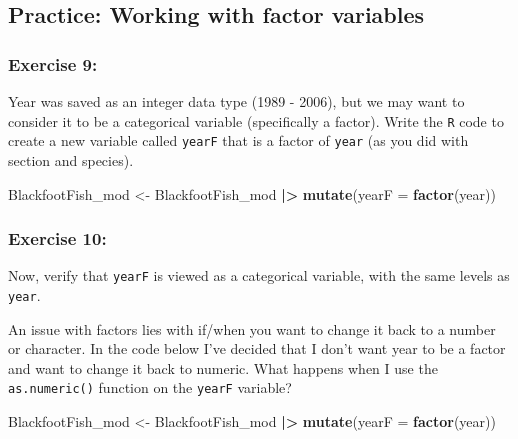 \documentclass[
  10pt,
  letterpaper,
  twoside,
  openright]{book}
\newenvironment{Shaded}{\begin{snugshade}}{\end{snugshade}}
\newcommand{\AttributeTok}[1]{\textcolor[rgb]{0.13,0.29,0.53}{#1}}
\newcommand{\FunctionTok}[1]{\textcolor[rgb]{0.13,0.29,0.53}{\textbf{#1}}}
\newcommand{\NormalTok}[1]{#1}
\newcommand{\OtherTok}[1]{\textcolor[rgb]{0.56,0.35,0.01}{#1}}
\newcommand{\SpecialCharTok}[1]{\textcolor[rgb]{0.81,0.36,0.00}{\textbf{#1}}}
\begin{document}
\hypertarget{practice-working-with-factor-variables}{%
\subsection{Practice: Working with factor
variables}\label{practice-working-with-factor-variables}}

\hypertarget{exercise-9}{%
\subsubsection{Exercise 9:}\label{exercise-9}}

Year was saved as an integer data type (1989 - 2006), but we may want to
consider it to be a categorical variable (specifically a factor). Write
the \texttt{R} code to create a new variable called \texttt{yearF} that
is a factor of \texttt{year} (as you did with section and species).

\begin{Shaded}
\begin{Highlighting}[]
\NormalTok{BlackfootFish\_mod }\OtherTok{\textless{}{-}}\NormalTok{ BlackfootFish\_mod }\SpecialCharTok{|\textgreater{}}
  \FunctionTok{mutate}\NormalTok{(}\AttributeTok{yearF =} \FunctionTok{factor}\NormalTok{(year))}
\end{Highlighting}
\end{Shaded}

\hypertarget{exercise-10}{%
\subsubsection{Exercise 10:}\label{exercise-10}}

Now, verify that \texttt{yearF} is viewed as a categorical variable,
with the same levels as \texttt{year}.

An issue with factors lies with if/when you want to change it back to a
number or character. In the code below I've decided that I don't want
year to be a factor and want to change it back to numeric. What happens
when I use the \texttt{as.numeric()} function on the \texttt{yearF}
variable?

\begin{Shaded}
\begin{Highlighting}[]
\NormalTok{BlackfootFish\_mod }\OtherTok{\textless{}{-}}\NormalTok{ BlackfootFish\_mod }\SpecialCharTok{|\textgreater{}}
  \FunctionTok{mutate}\NormalTok{(}\AttributeTok{yearF =} \FunctionTok{factor}\NormalTok{(year))}
\end{Highlighting}
\end{Shaded}
\end{document}
